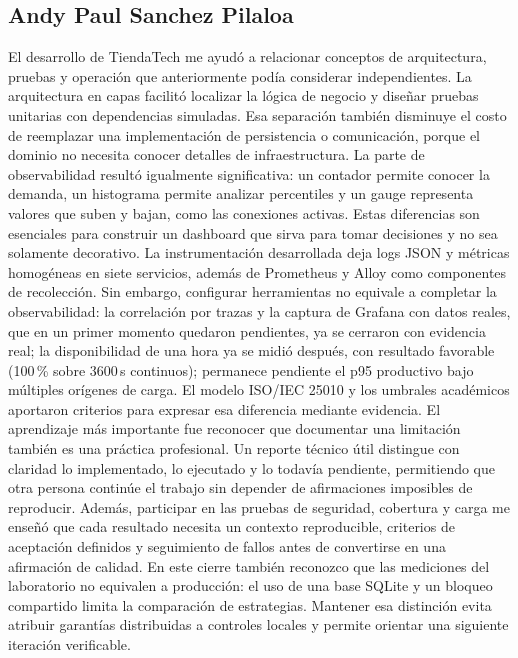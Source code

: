 \documentclass[12pt,a4paper]{article}
\begin{document}
\subsection{Andy Paul Sanchez Pilaloa}
El desarrollo de TiendaTech me ayudó a relacionar conceptos de arquitectura, pruebas y operación que anteriormente podía considerar independientes. La arquitectura en capas facilitó localizar la lógica de negocio y diseñar pruebas unitarias con dependencias simuladas. Esa separación también disminuye el costo de reemplazar una implementación de persistencia o comunicación, porque el dominio no necesita conocer detalles de infraestructura. La parte de observabilidad resultó igualmente significativa: un contador permite conocer la demanda, un histograma permite analizar percentiles y un gauge representa valores que suben y bajan, como las conexiones activas. Estas diferencias son esenciales para construir un dashboard que sirva para tomar decisiones y no sea solamente decorativo. La instrumentación desarrollada deja logs JSON y métricas homogéneas en siete servicios, además de Prometheus y Alloy como componentes de recolección. Sin embargo, configurar herramientas no equivale a completar la observabilidad: la correlación por trazas y la captura de Grafana con datos reales, que en un primer momento quedaron pendientes, ya se cerraron con evidencia real; la disponibilidad de una hora ya se midió después, con resultado favorable (100\,\% sobre 3600\,s continuos); permanece pendiente el p95 productivo bajo múltiples orígenes de carga. El modelo ISO/IEC 25010 y los umbrales académicos aportaron criterios para expresar esa diferencia mediante evidencia. El aprendizaje más importante fue reconocer que documentar una limitación también es una práctica profesional. Un reporte técnico útil distingue con claridad lo implementado, lo ejecutado y lo todavía pendiente, permitiendo que otra persona continúe el trabajo sin depender de afirmaciones imposibles de reproducir. Además, participar en las pruebas de seguridad, cobertura y carga me enseñó que cada resultado necesita un contexto reproducible, criterios de aceptación definidos y seguimiento de fallos antes de convertirse en una afirmación de calidad. En este cierre también reconozco que las mediciones del laboratorio no equivalen a producción: el uso de una base SQLite y un bloqueo compartido limita la comparación de estrategias. Mantener esa distinción evita atribuir garantías distribuidas a controles locales y permite orientar una siguiente iteración verificable.
\end{document}

